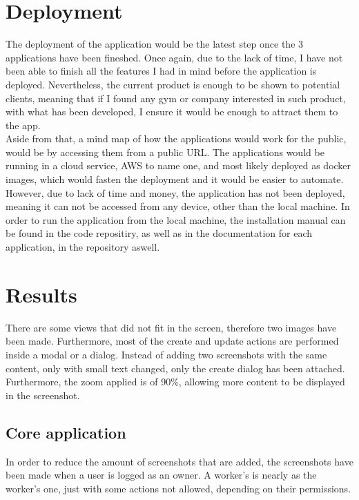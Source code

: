 \documentclass[a4paper, 12pt, oneside]{book}
\begin{document}
\section{Deployment}
The deployment of the application would be the latest step once the 3 applications have been fineshed. Once again, due to the lack of time, I have not been able to finish all the features I had in mind before the application is deployed. Nevertheless, the current product is enough to be shown to potential clients, meaning that if I found any gym or company interested in such product, with what has been developed, I ensure it would be enough to attract them to the app.
\\[8pt]
Aside from that, a mind map of how the applications would work for the public, would be by accessing them from a public URL. The applications would be running in a cloud service, AWS to name one, and most likely deployed as docker images, which would fasten the deployment and it would be easier to automate. However, due to lack of time and money, the application has not been deployed, meaning it can not be accessed from any device, other than the local machine. In order to run the application from the local machine, the installation manual can be found in the code repositiry, as well as in the documentation for each application, in the repository aswell.
\section{Results}
There are some views that did not fit in the screen, therefore two images have been made. Furthermore, most of the create and update actions are performed inside a modal or a dialog. Instead of adding two screenshots with the same content, only with small text changed, only the create dialog has been attached. Furthermore, the zoom applied is of 90\%, allowing more content to be displayed in the screenshot.
\subsection{Core application}
In order to reduce the amount of screenshots that are added, the screenshots have been made when a user is logged as an owner. A worker's is nearly as the worker's one, just with some actions not allowed, depending on their permissions.
\end{document}
